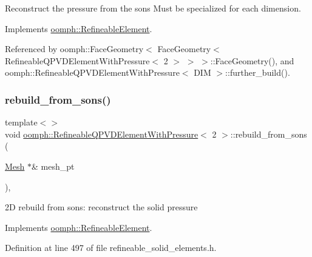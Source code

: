 Reconstruct the pressure from the sons Must be specialized for each dimension. 



Implements \hyperlink{classoomph_1_1RefineableElement_a33324be27833fa4b78279d17158215fa}{oomph\+::\+Refineable\+Element}.



Referenced by oomph\+::\+Face\+Geometry$<$ Face\+Geometry$<$ Refineable\+Q\+P\+V\+D\+Element\+With\+Pressure$<$ 2 $>$ $>$ $>$\+::\+Face\+Geometry(), and oomph\+::\+Refineable\+Q\+P\+V\+D\+Element\+With\+Pressure$<$ D\+I\+M $>$\+::further\+\_\+build().

\mbox{\label{classoomph_1_1RefineableQPVDElementWithPressure_ad001c7401c2f62c377926870eb01f3e3}} 
\subsubsection{\texorpdfstring{rebuild\+\_\+from\+\_\+sons()}{rebuild\_from\_sons()}\hspace{0.1cm}{\footnotesize\ttfamily [2/3]}}
{\footnotesize\ttfamily template$<$$>$ \\
void \hyperlink{classoomph_1_1RefineableQPVDElementWithPressure}{oomph\+::\+Refineable\+Q\+P\+V\+D\+Element\+With\+Pressure}$<$ 2 $>$\+::rebuild\+\_\+from\+\_\+sons (\begin{DoxyParamCaption}\item[{\hyperlink{classoomph_1_1Mesh}{Mesh} $\ast$\&}]{mesh\+\_\+pt }\end{DoxyParamCaption})\hspace{0.3cm}{\ttfamily [inline]}, {\ttfamily [virtual]}}



2D rebuild from sons\+: reconstruct the solid pressure 



Implements \hyperlink{classoomph_1_1RefineableElement_a33324be27833fa4b78279d17158215fa}{oomph\+::\+Refineable\+Element}.



Definition at line 497 of file refineable\+\_\+solid\+\_\+elements.\+h.



